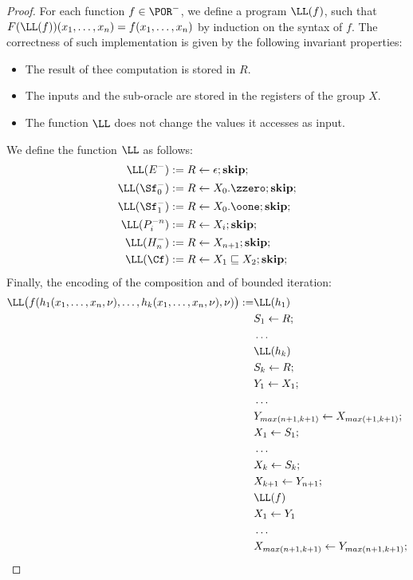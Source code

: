\begin{proof}
For each function $f\in \POR^-$, we define a
program $\LL(f)$, such that
$F(\LL(f))(x_1,\dots, x_n)=
f(x_1,\dots, x_n)$ by induction on the syntax
of $f$.
%
The correctness of such implementation is
given by the following invariant properties:
\begin{itemize}
\item The result of thee computation is stored in $R$.
%
\item The inputs and the sub-oracle are stored in the registers of the group $X$.
%
\item The function $\LL$ does not change the values
it accesses as input.
\end{itemize}
We define the function $\LL$ as follows:
\begin{align*}
\LL(E^-) &:= R \leftarrow \epsilon;
\mathbf{skip}; \\
%
\LL(\Sf^-_0) &:= R \leftarrow X_0.{\zzero};
\mathbf{skip}; \\
%
\LL(\Sf^-_1) &:= R \leftarrow X_0.{\oone};
\mathbf{skip}; \\
%
\LL(P^{-n}_i) &:= R \leftarrow X_i;
\mathbf{skip}; \\
%
\LL(H^-_n) &:= R \leftarrow X_{n+1};
\mathbf{skip}; \\
%
\LL(\Cf) &:= R \leftarrow X_1 \sqsubseteq  X_2;
\mathbf{skip};
\end{align*}
%
%
Finally, the encoding of the composition
and of bounded iteration:
\begin{align*}
\LL\big(f(h_1(x_1,\dots, x_n,\nu),\dots,
h_k(x_1,\dots, x_n,\nu),\nu)\big) :=
& \LL(h_1) \\
%
& S_1 \leftarrow R; \\
%
& \dots \\
%
& \LL(h_k) \\
%
& S_k\leftarrow R; \\
%
& Y_1 \leftarrow X_1; \\
%
& \dots \\
%
& Y_{max(n+1,k+1)} \leftarrow X_{max(+1,k+1)}; \\
%
& X_1\leftarrow S_1; \\
%
& \dots \\
%
& X_k \leftarrow S_k; \\
%
& X_{k+1} \leftarrow Y_{n+1}; \\
%
& \LL(f) \\
%
& X_1 \leftarrow  Y_1 \\
%
& \dots \\
%
& X_{max(n+1,k+1)} \leftarrow Y_{max(n+1,k+1)}; \\

\end{align*}
\end{proof}
